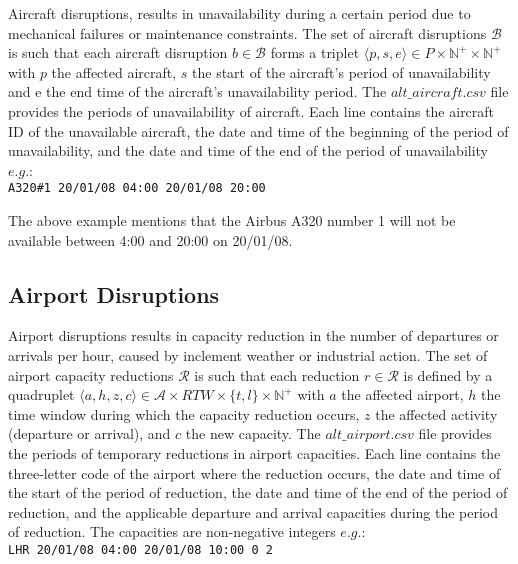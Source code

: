 \documentclass[ijoo,nonblindrev]{informs-ijoo}
\begin{document}
	Aircraft disruptions, results in unavailability during a certain period due to mechanical failures or maintenance constraints. The set of aircraft disruptions $\mathcal{B}$ is such that each aircraft disruption $b \in \mathcal{B}$ forms a triplet $\langle p, s, e \rangle  \in P \times \mathbb{N}^{+} \times \mathbb{N}^{+}$ with $p$ the affected aircraft, $s$ the start of the aircraft's period of unavailability and e the end time of the aircraft's unavailability period.
	The $alt\_aircraft.csv$ file provides the periods of unavailability of aircraft. Each line contains the aircraft ID of the unavailable aircraft, the date and 	time  of the beginning of the period of unavailability, and the date and time of the end of the period of unavailability $e.g.$:\\
	\newline
	{\texttt{\footnotesize A320\#1 20/01/08 04:00 20/01/08 20:00}}
	\newline
	
	The above example mentions that the Airbus A320 number 1 will not be available between 4:00 and 20:00 on 20/01/08.
	
\subsection{Airport Disruptions} \label{subsec:airportDisr}
Airport disruptions results in capacity reduction in the number of departures or arrivals per hour, caused by inclement weather or industrial action. The set of airport capacity reductions $\mathcal{R}$ is such that each reduction $ r \in \mathcal{R}$ is defined by a quadruplet $\langle a, h, z, c\rangle \in \mathcal{A} \times RTW \times {\{t, l\}} \times \mathbb{N}^{+}$  with $a$ the affected airport, $h$ the time window during which the capacity reduction occurs, $z$ the affected activity (departure or arrival), and $c$ the new capacity. 
	The $alt\_airport.csv$ file provides the periods of temporary reductions in airport capacities. Each line contains the three-letter code of the airport where the reduction occurs, the date and time of the start of the period of reduction, the date and time of the end of the period of reduction, and the applicable departure and arrival 	capacities during the period of reduction. The capacities are non-negative integers $e.g.$:\\
	\newline
	{\texttt{\footnotesize LHR 20/01/08 04:00 20/01/08 10:00 0 2}}
	\newline
	
\end{document}

